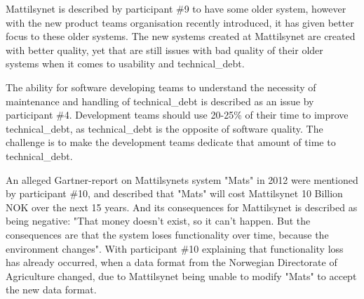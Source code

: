 
Mattilsynet is described by participant \#9 to have some older system, however with the new product teams organisation recently introduced, it has given better focus to these older systems. The new systems created at Mattilsynet are created with better quality, yet that are still issues with bad quality of their older systems when it comes to usability and \gls{technical_debt}.


The ability for software developing teams to understand the necessity of maintenance and handling of \gls{technical_debt} is described as an issue by participant \#4. Development teams should use 20-25\% of their time to improve \gls{technical_debt}, as \gls{technical_debt} is the opposite of software quality. The challenge is to make the development teams dedicate that amount of time to \gls{technical_debt}.


An alleged Gartner-report on Mattilsynets system "Mats" in 2012 were mentioned by participant \#10, and described that "Mats" will cost Mattilsynet 10 Billion NOK over the next 15 years. And its consequences for Mattilsynet is described as being negative: "That money doesn't exist, so it can't happen. But the consequences are that the system loses functionality over time, because the environment changes". With participant \#10 explaining that functionality loss has already occurred, when a data format from the Norwegian Directorate of Agriculture changed, due to Mattilsynet being unable to modify "Mats" to accept the new data format.

